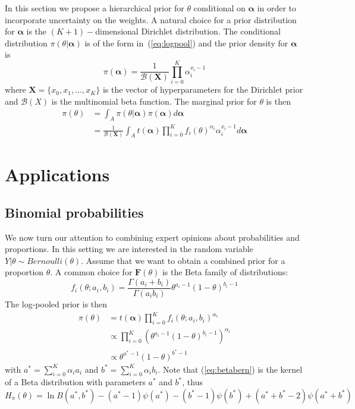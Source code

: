 \documentclass[a4paper, notitlepage, 10pt]{article}
\begin{document}
In this section we propose a hierarchical prior for $\theta$ conditional on $\boldsymbol\alpha$ in order to incorporate uncertainty on the weights.
A natural choice for a prior distribution for $\boldsymbol\alpha$ is the $(K+1)-$dimensional Dirichlet distribution.
The conditional distribution $\pi(\theta|\boldsymbol\alpha)$ is of the form in~(\ref{eq:logpool}) and the prior density for $\boldsymbol\alpha$ is 
\begin{equation}
 \label{eq:generalcondprior}
 \pi(\boldsymbol\alpha) = \frac{1}{\mathcal{B}(\boldsymbol X)}\prod_{i=0}^K \alpha_i^{x_i-1}
\end{equation}
where $\boldsymbol X = \{ x_0, x_1, \ldots, x_K\}$ is the vector of hyperparameters for the Dirichlet prior and $\mathcal{B}(X)$ is the multinomial beta function.
The marginal prior for $\theta$ is then
\begin{align}
 \label{eq:marginalhierprior}
 \pi(\theta) &= \int_{A}\pi(\theta|\boldsymbol\alpha)\pi(\boldsymbol\alpha)d\boldsymbol\alpha \\
             &= \frac{1}{\mathcal{B}(\boldsymbol X)}\int_{A}t(\boldsymbol\alpha)\prod_{i=0}^K f_i(\theta)^{\alpha_i}\alpha_i^{x_i-1}d\boldsymbol\alpha 
\end{align}

\section*{Applications}
\label{sec:apps}

\subsection*{Binomial probabilities}
\label{sec:beta}
We now turn our attention to combining expert opinions about probabilities and proportions.
In this setting we are interested in the random variable $Y | \theta \sim Bernoulli(\theta)$.
Assume that we want to obtain a combined prior for a proportion $\theta$.
A common choice for $\mathbf{F}(\theta)$ is the Beta family of distributions:
$$f_i(\theta;a_i, b_i) = \frac{\Gamma(a_i + b_i)}{\Gamma(a_i b_i)} \theta^{a_i-1}(1-\theta)^{b_i-1}$$
The log-pooled prior is then
\begin{align}
\pi(\theta)&= t(\boldsymbol\alpha)\prod_{i=0}^{K}f_i(\theta;a_i,b_i)^{\alpha_i}\\
&\propto \prod_{i=0}^{K} \left(\theta^{a_i-1}(1-\theta)^{b_i-1} \right)^{\alpha_i}\\
\label{eq:betabern}
&\propto \theta^{a^*-1}(1-\theta)^{b^*-1}
\end{align}
with $a^* =\sum_{i=0}^{K}\alpha_ia_i$ and $b^* = \sum_{i=0}^{K}\alpha_ib_i$.
Note that (\ref{eq:betabern}) is the kernel of a Beta distribution with parameters $a^*$ and $b^*$, thus 
\begin{equation}
 \label{eq:entropybeta}
 H_{\pi}(\theta) = \ln B(a^*,b^*) - (a^*-1)\psi(a^*) - (b^*-1)\psi(b^*) + (a^*+b^* -2)\psi(a^*+b^*)
\end{equation}
\end{document}
